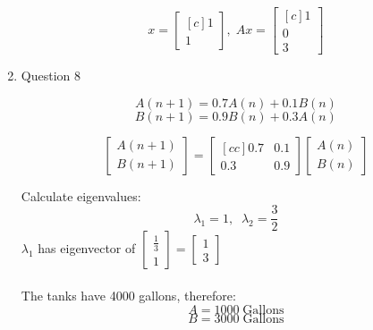\documentclass[a4paper,11pt]{article}
\begin{document}
\begin{preview}
\begin{enumerate}
        $$x = \begin{bmatrix}[c] 1\\1 \end{bmatrix}, \; Ax = \begin{bmatrix}[c] 1\\0\\3 \end{bmatrix} $$

        \item Question 8

        $$ A(n+1) = 0.7A(n)  + 0.1B(n) $$
        $$ B(n+1) = 0.9B(n)  + 0.3A(n) $$

        $$ \begin{bmatrix} A(n+1)\\B(n+1)\end{bmatrix} = \begin{bmatrix}[cc] 0.7&0.1\\0.3&0.9\end{bmatrix}\begin{bmatrix} A(n)\\B(n)\end{bmatrix}
        $$

        Calculate eigenvalues:
        $$\lambda_1 = 1, \;\; \lambda_2 = \frac{3}{2} $$
        $\lambda_1$ has eigenvector of $\begin{bmatrix} \frac{1}{3}\\1\end{bmatrix} = \begin{bmatrix} 1\\3\end{bmatrix}$\\\\

        The tanks have 4000 gallons, therefore:
        $$ A = 1000 \; \mathrm{Gallons}$$
        $$ B = 3000 \; \mathrm{Gallons}$$


        

    \end{enumerate}

\end{preview}
\end{document}

